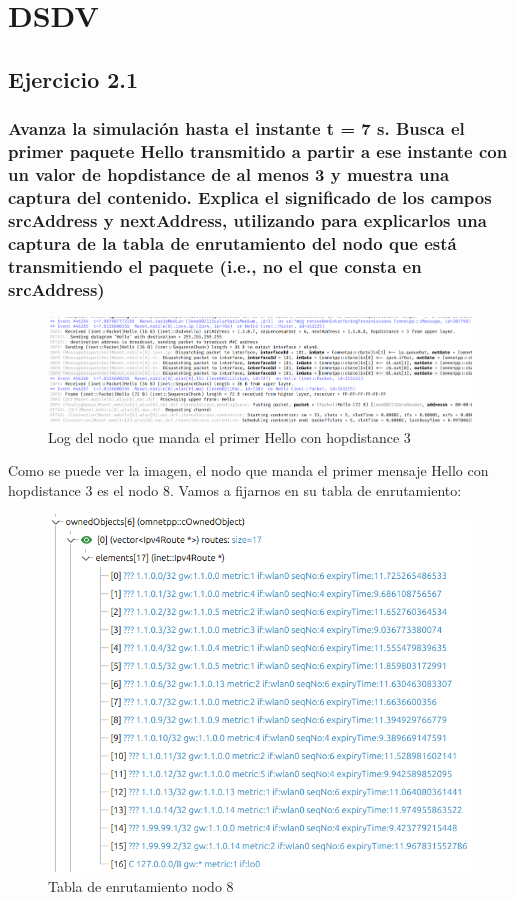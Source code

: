 \chapter{DSDV}
\label{chap:dsdv}

\section{Ejercicio 2.1}

\subsection{Avanza la simulación hasta el instante t = 7 s. Busca el primer paquete Hello transmitido a partir a ese
instante con un valor de hopdistance de al menos 3 y muestra una captura del contenido. Explica el significado
de los campos srcAddress y nextAddress, utilizando para explicarlos una captura de la tabla de enrutamiento del
nodo que está transmitiendo el paquete (i.e., no el que consta en srcAddress)}

\begin{figure}[H]
    \centering
    \includegraphics[width=155mm, scale=0.75]{imaxes/dsdv/ejercicio2_1.png}
    \caption{Log del nodo que manda el primer Hello con hopdistance 3}
    \label{fig:ejer2_1}
\end{figure}

Como se puede ver la imagen, el nodo que manda el primer mensaje Hello con hopdistance 3 es el nodo 8. Vamos a fijarnos en su tabla de enrutamiento:

\begin{figure}[H]
    \centering
    \includegraphics[width=115mm, scale=0.75]{imaxes/dsdv/ejercicio2_1_2.png}
    \caption{Tabla de enrutamiento nodo 8}
    \label{fig:ejer2_1_2}
\end{figure}

